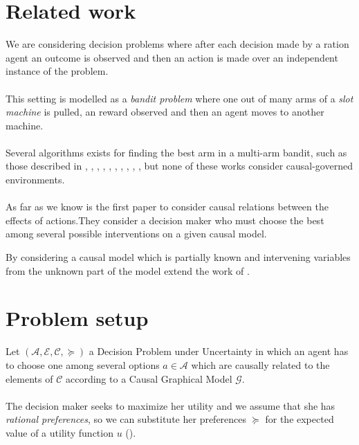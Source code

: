\documentclass[a0,portrait]{a0poster}
\begin{document}
\begin{multicols}{3}
\color{DarkSlateGray} %
\section*{Related work}
We are considering decision problems where after each decision made by a ration agent an outcome is observed and then an action is made over an independent instance of the problem.\\
\\
This setting is modelled as a \textit{bandit problem} where one out of many arms of a \textit{slot machine} is pulled, an reward observed and then an agent moves to another machine.\\
\\
Several algorithms exists for finding the best arm in a multi-arm bandit, such as those described in \cite{bubeck2009pure}, \cite{audibert2010best}, \cite{gabillon2012best}, \cite{agarwal2014taming} , \cite{jamieson2014lil},  \cite{jamieson2014best}, \cite{chen2015optimal}, \cite{carpentier2016tight}, \cite{russo2016simple},  \cite{kaufmann2016complexity}, but none of these works consider causal-governed environments.\\
\\
As far as we know \cite{lattimoreNIPS2016} is the first paper to consider causal relations between the effects of actions.They consider a decision maker who must choose the best among several possible interventions on a given causal model. 

By considering a causal model which is partially known and intervening variables from the unknown part of the model \cite{sen2017identifying} extend the work of \cite{lattimoreNIPS2016}.

\section*{Problem setup}{\label{problem_setup}}
Let $(\mathcal{A},\mathcal{E},\mathcal{C},\succeq)$ a Decision Problem under Uncertainty in which an agent has to choose one among several options $a \in \mathcal{A}$ which are causally related to the elements of $\mathcal{C}$ according to a Causal Graphical Model $\mathcal{G}$.\\
\\
The decision maker seeks to maximize her utility and we assume that she has \textit{rational preferences}, so we can substitute her preferences $\succeq$ for the expected value of a utility function $u$ (\cite{gilboa2009decision}).


\end{multicols}
\end{document}
